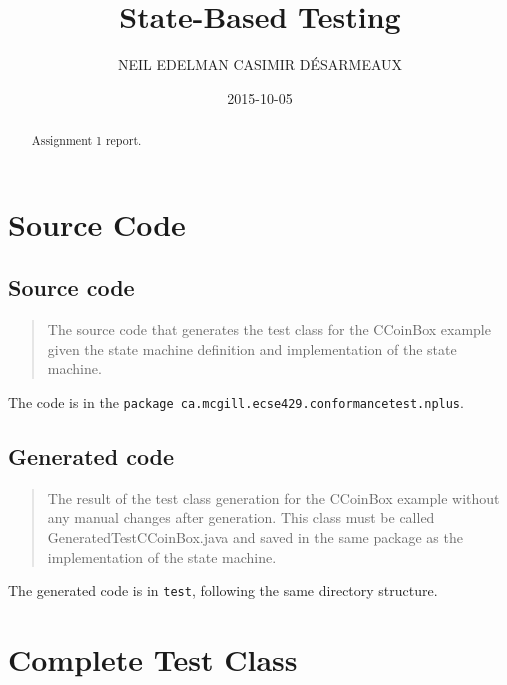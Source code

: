 \documentclass[ieee]{submit}
\title{State-Based Testing}
\date{2015-10-05}
\author{
	\MakeUppercase{Neil Edelman}
	\affil{McGill University (110121860)}
	\MakeUppercase{Casimir D\'esarmeaux}
	\affil{McGill University (260467441)}
}
\begin{document}

\begin{abstract}
Assignment 1 report.
\end{abstract}

\maketitle


\clearpage
{}

\tableofcontents



\clearpage
{}

\section{Source Code}

\subsection{Source code}

\begin{quote}
The source code that generates the test class for the CCoinBox example given the state
machine definition and implementation of the state machine.
\end{quote}

The code is in the {\tt package ca.mcgill.ecse429.conformancetest.nplus}.

\subsection{Generated code}

\begin{quote}
The result of the test class generation for the CCoinBox example without any manual changes
after generation. This class must be called GeneratedTestCCoinBox.java and saved in the same package as the implementation of the state machine.
\end{quote}

The generated code is in {\tt test}, following the same directory structure.

\section{Complete Test Class}
\end{document}
